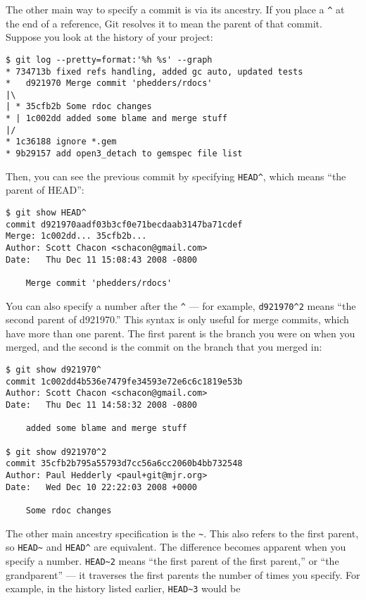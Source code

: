 \documentclass[a4paper]{book}
\begin{document}
The other main way to specify a commit is via its ancestry. If you place a \texttt{\^{}} at the end of a reference, Git resolves it to mean the parent of that commit. Suppose you look at the history of your project:

\begin{shaded}\begin{verbatim}
$ git log --pretty=format:'%h %s' --graph
* 734713b fixed refs handling, added gc auto, updated tests
*   d921970 Merge commit 'phedders/rdocs'
|\
| * 35cfb2b Some rdoc changes
* | 1c002dd added some blame and merge stuff
|/
* 1c36188 ignore *.gem
* 9b29157 add open3_detach to gemspec file list
\end{verbatim}\end{shaded}

Then, you can see the previous commit by specifying \texttt{HEAD\^{}}, which means “the parent of HEAD”:

\begin{shaded}\begin{verbatim}
$ git show HEAD^
commit d921970aadf03b3cf0e71becdaab3147ba71cdef
Merge: 1c002dd... 35cfb2b...
Author: Scott Chacon <schacon@gmail.com>
Date:   Thu Dec 11 15:08:43 2008 -0800

    Merge commit 'phedders/rdocs'
\end{verbatim}\end{shaded}

You can also specify a number after the \texttt{\^{}} --- for example, \texttt{d921970\^{}2} means “the second parent of d921970.” This syntax is only useful for merge commits, which have more than one parent. The first parent is the branch you were on when you merged, and the second is the commit on the branch that you merged in:

\begin{shaded}\begin{verbatim}
$ git show d921970^
commit 1c002dd4b536e7479fe34593e72e6c6c1819e53b
Author: Scott Chacon <schacon@gmail.com>
Date:   Thu Dec 11 14:58:32 2008 -0800

    added some blame and merge stuff

$ git show d921970^2
commit 35cfb2b795a55793d7cc56a6cc2060b4bb732548
Author: Paul Hedderly <paul+git@mjr.org>
Date:   Wed Dec 10 22:22:03 2008 +0000

    Some rdoc changes
\end{verbatim}\end{shaded}

The other main ancestry specification is the \texttt{\textasciitilde{}}. This also refers to the first parent, so \texttt{HEAD\textasciitilde{}} and \texttt{HEAD\^{}} are equivalent. The difference becomes apparent when you specify a number. \texttt{HEAD\textasciitilde{}2} means “the first parent of the first parent,” or “the grandparent” --- it traverses the first parents the number of times you specify. For example, in the history listed earlier, \texttt{HEAD\textasciitilde{}3} would be
\end{document}
